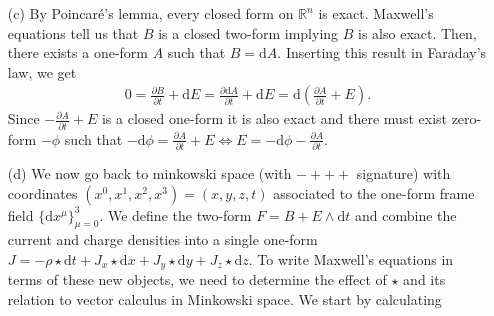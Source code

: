 \documentclass[10pt, a4paper]{article}
\begin{document}
{\begin{enumerate}
  Using results derived from problem 1, (b) we can use the original set of Maxwell equations to write  
  \begin{align*}
    &0 = \nabla \cdot \tilde{B} = \nabla \cdot (\star B)^\sharp = \star \text{d} \star (\star B) = \star \text{d} B \iff \text{d} B = 0 \quad \text{($\star$ is an involution)}\\
    &\mu_0 \rho =  \nabla \cdot \tilde{E} = \nabla \cdot E^\sharp = \star \text{d} \star E\\
    &0 = \frac{\partial \tilde{B}}{\partial t} + \nabla \times \tilde{E} = \frac{\partial (\star B)^\sharp}{\partial t} + (\star \text{d}E)^{\sharp} \iff 0 = \frac{\partial \star B}{\partial t} + (\star \text{d}E) \iff 0 = \frac{\partial B}{\partial t} + \text{d}E \quad \text{($\star$ is an involution, $\sharp$ is invertible)}\\
    &\mu_0 \tilde{J} = \mu_0 J^\sharp = -\frac{\partial \tilde{E}}{\partial t} + \nabla \times \tilde{B} = -\frac{\partial E^\sharp}{\partial t} + \nabla \times (\star B)^\sharp = -\frac{\partial E^\sharp}{\partial t} + (\star \text{d} \star B)^{\sharp} \iff \mu_0 J = -\frac{\partial E^\sharp}{\partial t} + (\star \text{d} \star B)^{\sharp} \quad \text{($\sharp$ is invertible)}
  \end{align*}
  where $\mu_0$ is the magnetic permeability (the equations are written in $c = 1$ units)
  \item[(c)] By Poincaré's lemma, every closed form on $\mathbb{R}^n$ is exact. Maxwell's equations tell us that $B$ is a closed two-form implying $B$ is also exact. Then, there exists a one-form $A$ such that $B = \text{d}A$. Inserting this result in Faraday's law, we get 
  \begin{align*}
    0 = \frac{\partial B}{\partial t} + \text{d}E = \frac{\partial \text{d}A}{\partial t} + \text{d}E = \text{d}\left(\frac{\partial A}{\partial t} + E\right). 
  \end{align*}
  Since $-\frac{\partial A}{\partial t} + E$ is a closed one-form it is also exact and there must exist zero-form $-\phi$ such that $-\text{d}\phi = \frac{\partial A}{\partial t} + E \iff E = -\text{d}\phi -\frac{\partial A}{\partial t}$.
  \item[(d)] We now go back to minkowski space (with $-+++$ signature) with coordinates $(x^0, x^1, x^2, x^3) =(x, y, z, t)$ associated to the one-form frame field $\{\text{d}x^\mu\}_{\mu=0}^3$. We define the two-form $F = B + E \wedge \text{d}t$ and combine the current and charge densities into a single one-form $J = -\rho \star \mathrm{d} t+J_x \star \mathrm{d} x+J_y \star \mathrm{d} y+J_z \star \mathrm{d} z$. To write Maxwell's equations in terms of these new objects, we need to determine the effect of $\star$ and its relation to vector calculus in Minkowski space. We start by calculating 

\end{enumerate}}
\end{document}
